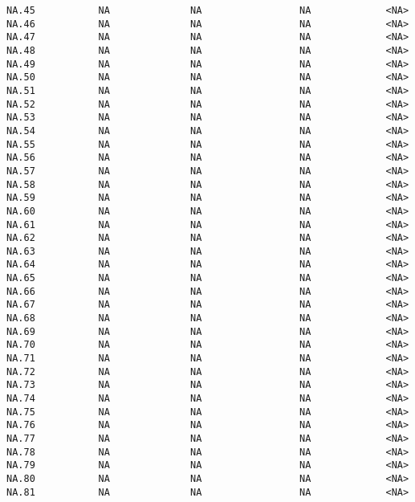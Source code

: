 \documentclass[
  letterpaper,
  DIV=11,
  numbers=noendperiod]{scrartcl}
\begin{document}
\begin{verbatim}
NA.45           NA              NA                 NA             <NA>
NA.46           NA              NA                 NA             <NA>
NA.47           NA              NA                 NA             <NA>
NA.48           NA              NA                 NA             <NA>
NA.49           NA              NA                 NA             <NA>
NA.50           NA              NA                 NA             <NA>
NA.51           NA              NA                 NA             <NA>
NA.52           NA              NA                 NA             <NA>
NA.53           NA              NA                 NA             <NA>
NA.54           NA              NA                 NA             <NA>
NA.55           NA              NA                 NA             <NA>
NA.56           NA              NA                 NA             <NA>
NA.57           NA              NA                 NA             <NA>
NA.58           NA              NA                 NA             <NA>
NA.59           NA              NA                 NA             <NA>
NA.60           NA              NA                 NA             <NA>
NA.61           NA              NA                 NA             <NA>
NA.62           NA              NA                 NA             <NA>
NA.63           NA              NA                 NA             <NA>
NA.64           NA              NA                 NA             <NA>
NA.65           NA              NA                 NA             <NA>
NA.66           NA              NA                 NA             <NA>
NA.67           NA              NA                 NA             <NA>
NA.68           NA              NA                 NA             <NA>
NA.69           NA              NA                 NA             <NA>
NA.70           NA              NA                 NA             <NA>
NA.71           NA              NA                 NA             <NA>
NA.72           NA              NA                 NA             <NA>
NA.73           NA              NA                 NA             <NA>
NA.74           NA              NA                 NA             <NA>
NA.75           NA              NA                 NA             <NA>
NA.76           NA              NA                 NA             <NA>
NA.77           NA              NA                 NA             <NA>
NA.78           NA              NA                 NA             <NA>
NA.79           NA              NA                 NA             <NA>
NA.80           NA              NA                 NA             <NA>
NA.81           NA              NA                 NA             <NA>

\end{verbatim}
\end{document}
